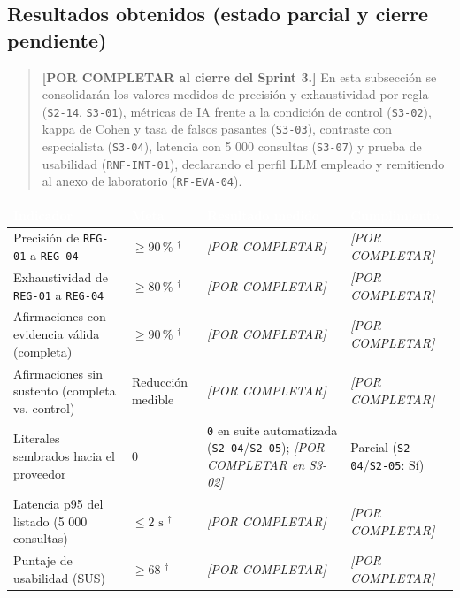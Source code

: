 \documentclass[12pt,a4paper]{article}
\newcommand{\dagsym}{\ensuremath{^{\dagger}}}
\begin{document}
\endgroup

\subsection{Resultados obtenidos (estado parcial y cierre pendiente)}

\begin{quote}
\textbf{[POR COMPLETAR al cierre del Sprint 3.]} En esta subsección se consolidarán los valores medidos de precisión y exhaustividad por regla (\texttt{S2-14}, \texttt{S3-01}), métricas de IA frente a la condición de control (\texttt{S3-02}), kappa de Cohen y tasa de falsos pasantes (\texttt{S3-03}), contraste con especialista (\texttt{S3-04}), latencia con 5 000 consultas (\texttt{S3-07}) y prueba de usabilidad (\texttt{RNF-INT-01}), declarando el perfil LLM empleado y remitiendo al anexo de laboratorio (\texttt{RF-EVA-04}).
\end{quote}

\begingroup
{}
\small
\begin{tabularx}{\textwidth}{X p{} p{} p{}}
\toprule
\rowcolor{utbblue}
\textcolor{white}{\textbf{Indicador}} & \textcolor{white}{\textbf{Meta}} & \textcolor{white}{\textbf{Resultado medido}} & \textcolor{white}{\textbf{Cumplimiento}} \\
\midrule
Precisión de \texttt{REG-01} a \texttt{REG-04} & $\ge 90\,\%$ \dagsym{} & \textit{[POR COMPLETAR]} & \textit{[POR COMPLETAR]} \\
Exhaustividad de \texttt{REG-01} a \texttt{REG-04} & $\ge 80\,\%$ \dagsym{} & \textit{[POR COMPLETAR]} & \textit{[POR COMPLETAR]} \\
Afirmaciones con evidencia válida (completa) & $\ge 90\,\%$ \dagsym{} & \textit{[POR COMPLETAR]} & \textit{[POR COMPLETAR]} \\
Afirmaciones sin sustento (completa vs. control) & Reducción medible & \textit{[POR COMPLETAR]} & \textit{[POR COMPLETAR]} \\
Literales sembrados hacia el proveedor & 0 & \texttt{0} en suite automatizada (\texttt{S2-04}/\texttt{S2-05}); \textit{[POR COMPLETAR en S3-02]} & Parcial (\texttt{S2-04}/\texttt{S2-05}: Sí) \\
Latencia p95 del listado (5 000 consultas) & $\le 2\text{ s}$ \dagsym{} & \textit{[POR COMPLETAR]} & \textit{[POR COMPLETAR]} \\
Puntaje de usabilidad (SUS) & $\ge 68$ \dagsym{} & \textit{[POR COMPLETAR]} & \textit{[POR COMPLETAR]} \\
\bottomrule
\end{tabularx}
\endgroup
\end{document}
